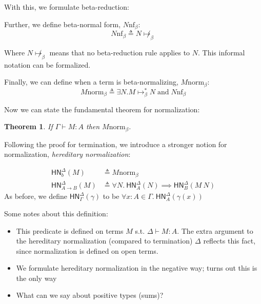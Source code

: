 \documentclass{article}
\newtheorem{thm}{Theorem}
\newcommand{\hasEF}[3]{\ensuremath{#1 \vdash #2 : #3}}
\newcommand{\contrb}[2]{#1 \mathrel{\text{contr}_\beta} #2}
\newcommand{\bnf}[1]{#1 \mathrel{\text{nf}_\beta}}
\newcommand{\bnorm}[1]{#1 \mathrel{\text{norm}_\beta}}
\newcommand{\stepb}[2]{\ensuremath{#1 \mapsto_{\beta} #2}}
\newcommand{\stepbs}[2]{\ensuremath{#1 \mapsto_{\beta}^* #2}}
\newcommand{\hnorm}[3]{\ensuremath{\mathsf{HN}^{#1}_{#2}(#3)}}
\newcommand{\fn}[2]{\ensuremath{#1 \to #2}}
\newcommand{\ap}[2]{\ensuremath{#1\ #2}}
\newcommand{\lam}[3]{\ensuremath{\lambda #1 {:} #2.\, #3}}
\begin{document}
With this, we formulate beta-reduction: 


Further, we define beta-normal form, $\bnf{N}$:
\[
\bnf{N} \triangleq N \not\mapsto_{\beta}
\]

Where $N \not\mapsto_{\beta}$ means that no beta-reduction rule applies to $N$. This informal notation can be formalized.

Finally, we can define when a term is beta-normalizing, $\bnorm{M}$: 
\[
\bnorm{M} \triangleq \exists N. \stepbs{M}{N} \;\text{and}\; \bnf{N}
\]

Now we can state the fundamental theorem for normalization: 
\begin{thm}
If $\hasEF{\Gamma}{M}{A}$ then $\bnorm{M}$.
\end{thm}

Following the proof for termination, we introduce a stronger notion for normalization, \emph{hereditary normalization}:

\begin{align*}
  \hnorm{\Delta}{b}{M} &\triangleq \bnorm{M}\\
  \hnorm{\Delta}{\fn{A}{B}}{M} &\triangleq
  \forall N.\ \hnorm{\Delta}{A}{N} \implies \hnorm{\Delta}{B}{\ap{M}{N}}
\end{align*}
As before, we define $\hnorm{\Delta}{\Gamma}{\gamma}$ to be $\forall x : A \in \Gamma.\ \hnorm{\Delta}{A}{\gamma(x)}$

Some notes about this definition:
\begin{itemize}
\setlength\itemsep{1em}
\item This predicate is defined on terms $M$ s.t. $\hasEF{\Delta}{M}{A}$. The extra argument to the hereditary normalization (compared to termination) $\Delta$ reflects this fact, since normalization is defined on open terms. \\
\item We formulate hereditary normalization in the negative way; turns out this is the only way\\
\item What can we say about positive types (sums)?
\end{itemize}
\end{document}
